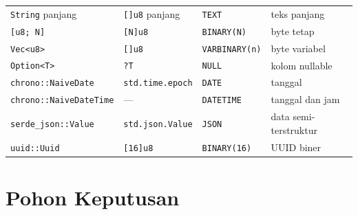\documentclass[11pt,a4paper]{article}
\begin{document}
\begin{table}[H]
\begin{tabularx}{\textwidth}{l l l X}
		\texttt{String} panjang         & \texttt{[]u8} panjang   & \texttt{TEXT}              & teks panjang              \\
		\texttt{[u8; N]}                & \texttt{[N]u8}          & \texttt{BINARY(N)}         & byte tetap                \\
		\texttt{Vec<u8>}                & \texttt{[]u8}           & \texttt{VARBINARY(n)}      & byte variabel             \\
		\texttt{Option<T>}              & \texttt{?T}             & \texttt{NULL}              & kolom nullable            \\
		\texttt{chrono::NaiveDate}      & \texttt{std.time.epoch} & \texttt{DATE}              & tanggal                   \\
		\texttt{chrono::NaiveDateTime}  & ---                     & \texttt{DATETIME}          & tanggal dan jam           \\
		\texttt{serde\_json::Value}     & \texttt{std.json.Value} & \texttt{JSON}              & data semi-terstruktur     \\
		\texttt{uuid::Uuid}             & \texttt{[16]u8}         & \texttt{BINARY(16)}        & UUID biner                \\
		\bottomrule
	\end{tabularx}
\end{table}

\section{Pohon Keputusan}
\end{document}
